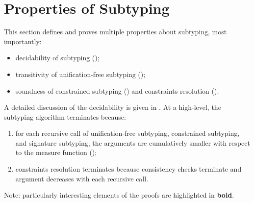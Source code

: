 \section{Properties of Subtyping}\label{sec:dec-sub:proofs}

This section defines and proves multiple properties about subtyping,
most importantly:
\begin{itemize}
    \item decidability of subtyping ();
    \item transitivity of unification-free subtyping ();
    \item soundness of constrained subtyping () 
        and constraints resolution ().
\end{itemize}

A detailed discussion of the decidability is given in .
At a high-level, the subtyping algorithm terminates because:
\begin{enumerate}
    \item for each recursive call of unification-free subtyping, 
        constrained subtyping, and signature subtyping, the arguments are
        cumulatively smaller with respect to the measure function
        ();
    \item constraints resolution terminates because consistency checks terminate
        and \UEnv argument decreases with each recursive call.
\end{enumerate}

Note: particularly interesting elements of the proofs are highlighted
in \textbf{bold}.



